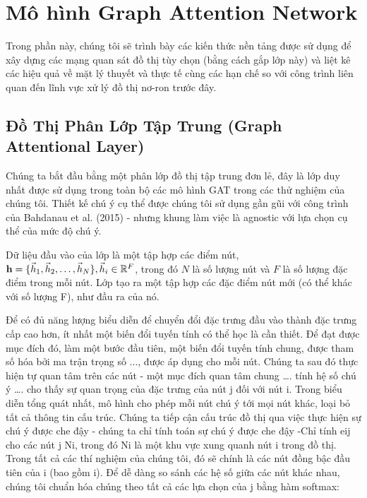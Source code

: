 \chapter{Mô hình Graph Attention Network}
\label{chap:gat-architecture}


Trong phần này, chúng tôi sẽ trình bày các kiến thức nền tảng được sử dụng để xây dựng các mạng quan sát đồ thị tùy chọn (bằng cách gắp lớp này) và liệt kê các hiệu quả về mặt lý thuyết và thực tế cùng các hạn chế so với công trình liên quan đến lĩnh vực xử lý đồ thị nơ-ron trước đây.




\section{Đồ Thị Phân Lớp Tập Trung (Graph Attentional Layer)}

Chúng ta bắt đầu bằng một phân lớp đồ thị tập trung đơn lẻ, đây là lớp duy nhất được sử dụng trong toàn bộ các mô hình GAT trong các thử nghiệm của chúng tôi. Thiết kế chú ý cụ thể được chúng tôi sử dụng gần gũi với công trình của Bahdanau et al. (2015) - nhưng khung làm việc là agnostic với lựa chọn cụ thể của mức độ chú ý.

Dữ liệu đầu vào của lớp là một tập hợp các điểm nút, ${\bf h} = \{\vec{h}_1, \vec{h}_2, \dots, \vec{h}_N\}, \vec{h}_i \in \mathbb{R}^F$, trong đó $N$ là số lượng nút và $F$ là số lượng đặc điểm trong mỗi nút. Lớp tạo ra một tập hợp các đặc điểm nút mới (có thể khác với số lượng F), như đầu ra của nó.

Để có đủ năng lượng biểu diễn để chuyển đổi đặc trưng đầu vào thành đặc trưng cấp cao hơn, ít nhất một biến đổi tuyến tính có thể học là cần thiết. Để đạt được mục đích đó, làm một bước đầu tiên, một biến đổi tuyến tính chung, được tham số hóa bởi ma trận trọng số  ..., được áp dụng cho mỗi nút. Chúng ta sau đó thực hiện tự quan tâm trên các nút - một mục đích quan tâm chung …. tính hệ số chú ý
….
cho thấy sự quan trọng của đặc trưng của nút j đối với nút i. Trong biểu diễn tổng quát nhất, mô hình cho phép mỗi nút chú ý tới mọi nút khác, loại bỏ tất cả thông tin cấu trúc. Chúng ta tiếp cận cấu trúc đồ thị qua việc thực hiện sự chú ý được che đậy - chúng ta chỉ tính toán sự chú ý được che đậy -Chỉ tính eij cho các nút j  Ni, trong đó Ni là một khu vực xung quanh nút i trong đồ thị. Trong tất cả các thí nghiệm của chúng tôi, đó sẽ chính là các nút đồng bậc đầu tiên của i (bao gồm i). Để dễ dàng so sánh các hệ số giữa các nút khác nhau, chúng tôi chuẩn hóa chúng theo tất cả các lựa chọn của j bằng hàm softmax:

